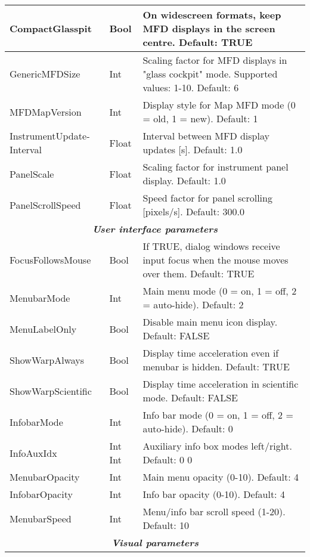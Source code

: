 \documentclass[Orbiter Developer Manual.tex]{subfiles}
\begin{document}
\begin{longtable}{ |p{}|p{}|p{}| }
	\hline\rule{0pt}{2ex}
	CompactGlasspit & Bool & On widescreen formats, keep MFD displays in the screen centre. Default: TRUE\\
	\hline\rule{0pt}{2ex}
	GenericMFDSize & Int & Scaling factor for MFD displays in "glass cockpit" mode. Supported values: 1-10. Default: 6\\
	\hline\rule{0pt}{2ex}
	MFDMapVersion & Int & Display style for Map MFD mode (0 = old, 1 = new). Default: 1\\
	\hline\rule{0pt}{2ex}
	InstrumentUpdate­Interval & Float & Interval between MFD display updates [s]. Default: 1.0\\
	\hline\rule{0pt}{2ex}
	PanelScale & Float & Scaling factor for instrument panel display. Default: 1.0\\
	\hline\rule{0pt}{2ex}
	PanelScrollSpeed & Float & Speed factor for panel scrolling [pixels/s]. Default: 300.0\\
	\hline
	\multicolumn{3}{|c|}{\rule{0pt}{2ex}\textbf{\textit{User interface parameters}}}\\
	\hline\rule{0pt}{2ex}
	FocusFollowsMouse & Bool & If TRUE, dialog windows receive input focus when the mouse moves over them. Default: TRUE\\
	\hline\rule{0pt}{2ex}
	MenubarMode & Int & Main menu mode (0 = on, 1 = off, 2 = auto-hide). Default: 2\\
	\hline\rule{0pt}{2ex}
	MenuLabelOnly & Bool & Disable main menu icon display. Default: FALSE\\
	\hline\rule{0pt}{2ex}
	ShowWarpAlways & Bool & Display time acceleration even if menubar is hidden. Default: TRUE\\
	\hline\rule{0pt}{2ex}
	ShowWarpScientific & Bool & Display time acceleration in scientific mode. Default: FALSE\\
	\hline\rule{0pt}{2ex}
	InfobarMode & Int & Info bar mode (0 = on, 1 = off, 2 = auto-hide). Default: 0\\
	\hline\rule{0pt}{2ex}
	InfoAuxIdx & Int Int & Auxiliary info box modes left/right. Default: 0 0\\
	\hline\rule{0pt}{2ex}
	MenubarOpacity & Int & Main menu opacity (0-10). Default: 4\\
	\hline\rule{0pt}{2ex}
	InfobarOpacity & Int & Info bar opacity (0-10). Default: 4\\
	\hline\rule{0pt}{2ex}
	MenubarSpeed & Int & Menu/info bar scroll speed (1-20). Default: 10\\
	\hline
	\multicolumn{3}{|c|}{\rule{0pt}{2ex}\textbf{\textit{Visual parameters}}}\\

\end{longtable}
\end{document}
